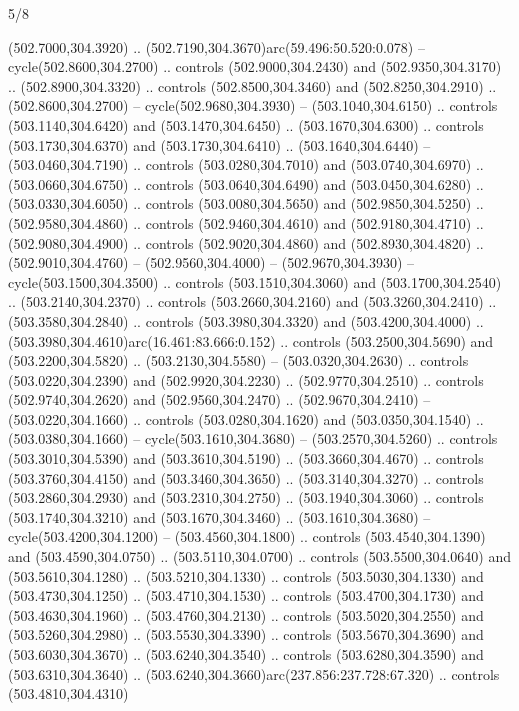 \begin{flagdescription}{5/8}
\begin{scope}[xshift=0.5\flaglength,yshift=0.5\flagwidth,scale=\flagwidth/475.63]
\begin{scope}[y=0.8pt, x=0.8pt, yscale=-1, xscale=1,shift={(-450,-300)}]
\begin{scope}[cm={{1.0,0.0,0.0,1.0,(-0.0002,0.12556)}},cm={{1.0,0.0,0.0,1.0,(0.00179,0.0)}}]
\begin{scope}[cm={{1.11592,0.0,0.0,1.11592,(-106.89933,-41.77764)}}]
\begin{scope}[draw=black,fill=cfff]
\begin{scope}[fill=black]
  (502.7000,304.3920) .. (502.7190,304.3670)arc(59.496:50.520:0.078) --
  cycle(502.8600,304.2700) .. controls (502.9000,304.2430) and
  (502.9350,304.3170) .. (502.8900,304.3320) .. controls (502.8500,304.3460) and
  (502.8250,304.2910) .. (502.8600,304.2700) -- cycle(502.9680,304.3930) --
  (503.1040,304.6150) .. controls (503.1140,304.6420) and (503.1470,304.6450) ..
  (503.1670,304.6300) .. controls (503.1730,304.6370) and (503.1730,304.6410) ..
  (503.1640,304.6440) -- (503.0460,304.7190) .. controls (503.0280,304.7010) and
  (503.0740,304.6970) .. (503.0660,304.6750) .. controls (503.0640,304.6490) and
  (503.0450,304.6280) .. (503.0330,304.6050) .. controls (503.0080,304.5650) and
  (502.9850,304.5250) .. (502.9580,304.4860) .. controls (502.9460,304.4610) and
  (502.9180,304.4710) .. (502.9080,304.4900) .. controls (502.9020,304.4860) and
  (502.8930,304.4820) .. (502.9010,304.4760) -- (502.9560,304.4000) --
  (502.9670,304.3930) -- cycle(503.1500,304.3500) .. controls
  (503.1510,304.3060) and (503.1700,304.2540) .. (503.2140,304.2370) .. controls
  (503.2660,304.2160) and (503.3260,304.2410) .. (503.3580,304.2840) .. controls
  (503.3980,304.3320) and (503.4200,304.4000) ..
  (503.3980,304.4610)arc(16.461:83.666:0.152) .. controls (503.2500,304.5690)
  and (503.2200,304.5820) .. (503.2130,304.5580) -- (503.0320,304.2630) ..
  controls (503.0220,304.2390) and (502.9920,304.2230) .. (502.9770,304.2510) ..
  controls (502.9740,304.2620) and (502.9560,304.2470) .. (502.9670,304.2410) --
  (503.0220,304.1660) .. controls (503.0280,304.1620) and (503.0350,304.1540) ..
  (503.0380,304.1660) -- cycle(503.1610,304.3680) -- (503.2570,304.5260) ..
  controls (503.3010,304.5390) and (503.3610,304.5190) .. (503.3660,304.4670) ..
  controls (503.3760,304.4150) and (503.3460,304.3650) .. (503.3140,304.3270) ..
  controls (503.2860,304.2930) and (503.2310,304.2750) .. (503.1940,304.3060) ..
  controls (503.1740,304.3210) and (503.1670,304.3460) .. (503.1610,304.3680) --
  cycle(503.4200,304.1200) -- (503.4560,304.1800) .. controls
  (503.4540,304.1390) and (503.4590,304.0750) .. (503.5110,304.0700) .. controls
  (503.5500,304.0640) and (503.5610,304.1280) .. (503.5210,304.1330) .. controls
  (503.5030,304.1330) and (503.4730,304.1250) .. (503.4710,304.1530) .. controls
  (503.4700,304.1730) and (503.4630,304.1960) .. (503.4760,304.2130) .. controls
  (503.5020,304.2550) and (503.5260,304.2980) .. (503.5530,304.3390) .. controls
  (503.5670,304.3690) and (503.6030,304.3670) .. (503.6240,304.3540) .. controls
  (503.6280,304.3590) and (503.6310,304.3640) ..
  (503.6240,304.3660)arc(237.856:237.728:67.320) .. controls (503.4810,304.4310)

\end{scope}
\end{scope}
\end{scope}
\end{scope}
\end{scope}
\end{scope}
\end{flagdescription}
